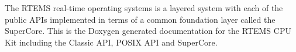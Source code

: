 The R\+T\+E\+MS real-\/time operating systems is a layered system with each of the public A\+P\+Is implemented in terms of a common foundation layer called the Super\+Core. This is the Doxygen generated documentation for the R\+T\+E\+MS C\+PU Kit including the Classic A\+PI, P\+O\+S\+IX A\+PI and Super\+Core. 